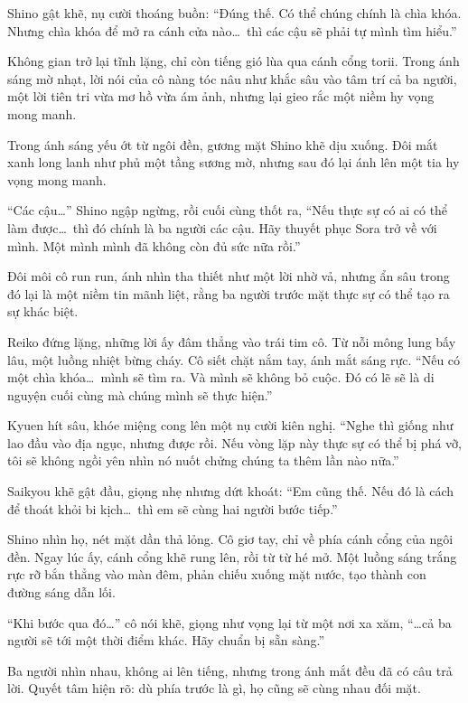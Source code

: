 \documentclass[../main.tex]{subfiles}
\begin{document}
Shino gật khẽ, nụ cười thoáng buồn: ``Đúng thế. Có thể chúng chính là chìa khóa. Nhưng chìa khóa để mở ra cánh cửa nào\dots\ thì các cậu sẽ phải tự mình tìm hiểu.''

Không gian trở lại tĩnh lặng, chỉ còn tiếng gió lùa qua cánh cổng torii. Trong ánh sáng mờ nhạt, lời nói của cô nàng tóc nâu như khắc sâu vào tâm trí cả ba người, một lời tiên tri vừa mơ hồ vừa ám ảnh, nhưng lại gieo rắc một niềm hy vọng mong manh.

Trong ánh sáng yếu ớt từ ngôi đền, gương mặt Shino khẽ dịu xuống. Đôi mắt xanh long lanh như phủ một tầng sương mờ, nhưng sau đó lại ánh lên một tia hy vọng mong manh.

``Các cậu\dots'' Shino ngập ngừng, rồi cuối cùng thốt ra, ``Nếu thực sự có ai có thể làm được\dots\ thì đó chính là ba người các cậu. Hãy thuyết phục Sora trở về với mình. Một mình mình đã không còn đủ sức nữa rồi.''

Đôi môi cô run run, ánh nhìn tha thiết như một lời nhờ vả, nhưng ẩn sâu trong đó lại là một niềm tin mãnh liệt, rằng ba người trước mặt thực sự có thể tạo ra sự khác biệt.

Reiko đứng lặng, những lời ấy đâm thẳng vào trái tim cô. Từ nỗi mông lung bấy lâu, một luồng nhiệt bừng cháy. Cô siết chặt nắm tay, ánh mắt sáng rực. ``Nếu có một chìa khóa\dots\ mình sẽ tìm ra. Và mình sẽ không bỏ cuộc. Đó có lẽ sẽ là di nguyện cuối cùng mà chúng mình sẽ thực hiện.''

Kyuen hít sâu, khóe miệng cong lên một nụ cười kiên nghị. ``Nghe thì giống như lao đầu vào địa ngục, nhưng được rồi. Nếu vòng lặp này thực sự có thể bị phá vỡ, tôi sẽ không ngồi yên nhìn nó nuốt chửng chúng ta thêm lần nào nữa.''

Saikyou khẽ gật đầu, giọng nhẹ nhưng dứt khoát:
``Em cũng thế. Nếu đó là cách để thoát khỏi bi kịch\dots\ thì em sẽ cùng hai người bước tiếp.''

Shino nhìn họ, nét mặt dần thả lỏng. Cô giơ tay, chỉ về phía cánh cổng của ngôi đền. Ngay lúc ấy, cánh cổng khẽ rung lên, rồi từ từ hé mở. Một luồng sáng trắng rực rỡ bắn thẳng vào màn đêm, phản chiếu xuống mặt nước, tạo thành con đường sáng dẫn lối.

``Khi bước qua đó\dots'' cô nói khẽ, giọng như vọng lại từ một nơi xa xăm, ``\dots cả ba người sẽ tới một thời điểm khác. Hãy chuẩn bị sẵn sàng.''

Ba người nhìn nhau, không ai lên tiếng, nhưng trong ánh mắt đều đã có câu trả lời. Quyết tâm hiện rõ: dù phía trước là gì, họ cũng sẽ cùng nhau đối mặt.
\end{document}
